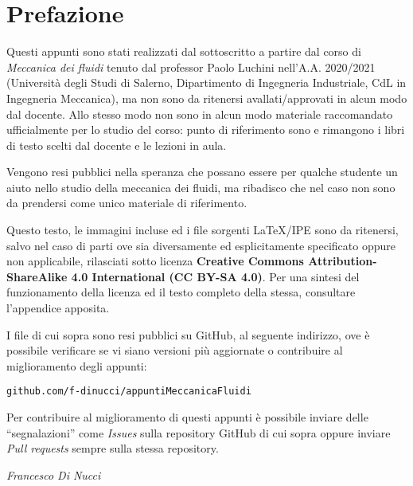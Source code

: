 %
\chapter*{Prefazione}
Questi appunti sono stati realizzati dal sottoscritto a partire dal corso di \textit{Meccanica dei fluidi} tenuto dal professor Paolo Luchini nell'A.A. 2020/2021 (Università degli Studi di Salerno, Dipartimento di Ingegneria Industriale, CdL in Ingegneria Meccanica), ma non sono da ritenersi avallati/approvati in alcun modo dal docente.
Allo stesso modo non sono in alcun modo materiale raccomandato ufficialmente per lo studio del corso: punto di riferimento sono e rimangono i libri di testo scelti dal docente e le lezioni in aula.

Vengono resi pubblici nella speranza che possano essere per qualche studente un aiuto nello studio della meccanica dei fluidi, ma ribadisco che nel caso non sono da prendersi come unico materiale di riferimento.

Questo testo, le immagini incluse ed i file sorgenti LaTeX/IPE sono da ritenersi, salvo nel caso di parti ove sia diversamente ed esplicitamente specificato oppure non applicabile, rilasciati sotto licenza \textbf{Creative Commons Attribution-ShareAlike 4.0 International (CC BY-SA 4.0)}.
Per una sintesi del funzionamento della licenza ed il testo completo della stessa, consultare l'appendice apposita.


I file di cui sopra sono resi pubblici su GitHub, al seguente indirizzo, ove è possibile verificare se vi siano versioni più aggiornate o contribuire al miglioramento degli appunti:
	\begin{center}
 		\texttt{github.com/f-dinucci/appuntiMeccanicaFluidi}
	\end{center}

Per contribuire al miglioramento di questi appunti è possibile inviare delle ``segnalazioni'' come \textit{Issues} sulla repository GitHub di cui sopra oppure inviare \textit{Pull requests} sempre sulla stessa repository.

\textit{Francesco Di Nucci}